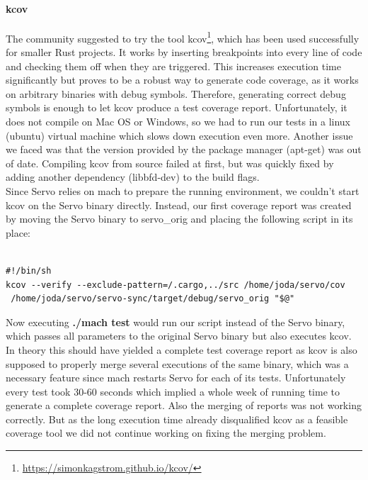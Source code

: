 \documentclass{scrartcl}
\begin{document}
\paragraph{kcov}
The community suggested to try the tool kcov\footnote{\url{https://simonkagstrom.github.io/kcov/}}, which has been used successfully for smaller Rust projects. It works by inserting breakpoints into every line of code and checking them off when they are triggered. This increases execution time significantly but proves to be a robust way to generate code coverage, as it works on arbitrary binaries with debug symbols. Therefore, generating correct debug symbols is enough to let kcov produce a test coverage report. Unfortunately, it does not compile on Mac OS or Windows, so we had to run our tests in a linux (ubuntu) virtual machine which slows down execution even more. Another issue we faced was that the version provided by the package manager (apt-get) was out of date. Compiling kcov from source failed at first, but was quickly fixed by adding another dependency (libbfd-dev) to the build flags.\\

Since Servo relies on mach to prepare the running environment, we couldn't start kcov on the Servo binary directly. Instead, our first coverage report was created by moving the Servo binary to servo\_orig and placing the following script in its place:

\begin{verbatim}

#!/bin/sh
kcov --verify --exclude-pattern=/.cargo,../src /home/joda/servo/cov 
 /home/joda/servo/servo-sync/target/debug/servo_orig "$@"

\end{verbatim}

Now executing \textbf{./mach test} would run our script instead of the Servo binary, which passes all parameters to the original Servo binary but also executes kcov. In theory this should have yielded a complete test coverage report as kcov is also supposed to properly merge several executions of the same binary, which was a necessary feature since mach restarts Servo for each of its tests. Unfortunately every test took 30-60 seconds which implied a whole week of running time to generate a complete coverage report. Also the merging of reports was not working correctly. But as the long execution time already disqualified kcov as a feasible coverage tool we did not continue working on fixing the merging problem.\\
\end{document}
